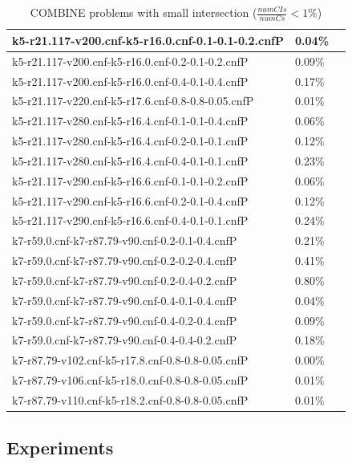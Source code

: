 \documentclass[12pt,a4paper,twoside]{scrartcl}
\numberwithin{equation}{section}
\begin{document}
\begin{table}[H]
\begin{center}
\begin{tabular}{|l|l|p{1cm}|}
 k5-r21.117-v200.cnf-k5-r16.0.cnf-0.1-0.1-0.2.cnfP&	0.04\%	\\   \hline
 k5-r21.117-v200.cnf-k5-r16.0.cnf-0.2-0.1-0.2.cnfP&	0.09\%	\\   \hline
 k5-r21.117-v200.cnf-k5-r16.0.cnf-0.4-0.1-0.4.cnfP&	0.17\%	\\   \hline
 k5-r21.117-v220.cnf-k5-r17.6.cnf-0.8-0.8-0.05.cnfP&	0.01\%	\\   \hline
 k5-r21.117-v280.cnf-k5-r16.4.cnf-0.1-0.1-0.4.cnfP&	0.06\%	\\   \hline
 k5-r21.117-v280.cnf-k5-r16.4.cnf-0.2-0.1-0.1.cnfP&	0.12\%	\\   \hline
 k5-r21.117-v280.cnf-k5-r16.4.cnf-0.4-0.1-0.1.cnfP&	0.23\%	\\   \hline
 k5-r21.117-v290.cnf-k5-r16.6.cnf-0.1-0.1-0.2.cnfP&	0.06\%	\\   \hline
 k5-r21.117-v290.cnf-k5-r16.6.cnf-0.2-0.1-0.4.cnfP&	0.12\%	\\   \hline
 k5-r21.117-v290.cnf-k5-r16.6.cnf-0.4-0.1-0.1.cnfP&	0.24\%	\\   \hline
 k7-r59.0.cnf-k7-r87.79-v90.cnf-0.2-0.1-0.4.cnfP&	0.21\%	\\   \hline
 k7-r59.0.cnf-k7-r87.79-v90.cnf-0.2-0.2-0.4.cnfP&	0.41\%	\\   \hline
 k7-r59.0.cnf-k7-r87.79-v90.cnf-0.2-0.4-0.2.cnfP&	0.80\%	\\   \hline
 k7-r59.0.cnf-k7-r87.79-v90.cnf-0.4-0.1-0.4.cnfP&	0.04\%	\\   \hline
 k7-r59.0.cnf-k7-r87.79-v90.cnf-0.4-0.2-0.4.cnfP&	0.09\%	\\   \hline
 k7-r59.0.cnf-k7-r87.79-v90.cnf-0.4-0.4-0.2.cnfP&	0.18\%	\\   \hline
 k7-r87.79-v102.cnf-k5-r17.8.cnf-0.8-0.8-0.05.cnfP&	0.00\%	\\   \hline
 k7-r87.79-v106.cnf-k5-r18.0.cnf-0.8-0.8-0.05.cnfP&	0.01\%	\\   \hline
 k7-r87.79-v110.cnf-k5-r18.2.cnf-0.8-0.8-0.05.cnfP&	0.01\%	\\   \hline

\end{tabular}
\caption{COMBINE problems with small intersection ($\frac{numCIs}{numCs} < 1\%$)}
\end{center}
\end{table} 

\subsection{Experiments}
\end{document}
